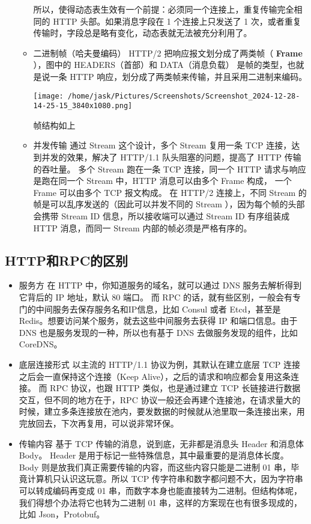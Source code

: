 \documentclass[11pt]{article}
\begin{document}
\begin{itemize}
\begin{itemize}
所以，使得动态表生效有一个前提：必须同一个连接上，重复传输完全相同的 HTTP 头部。如果消息字段在 1 个连接上只发送了 1 次，或者重复传输时，字段总是略有变化，动态表就无法被充分利用了。
\item 二进制帧（哈夫曼编码）
HTTP/2 把响应报文划分成了两类帧（ \textbf{Frame} ），图中的 HEADERS（首部）和 DATA（消息负载） 是帧的类型，也就是说一条 HTTP 响应，划分成了两类帧来传输，并且采用二进制来编码。
\begin{center}
\texttt{[image: /home/jask/Pictures/Screenshots/Screenshot\_2024-12-28-14-25-15\_3840x1080.png]}
\end{center}
帧结构如上
\item 并发传输
通过 Stream 这个设计，多个 Stream 复用一条 TCP 连接，达到并发的效果，解决了 HTTP/1.1 队头阻塞的问题，提高了 HTTP 传输的吞吐量。
多个 Stream 跑在一条 TCP 连接，同一个 HTTP 请求与响应是跑在同一个 Stream 中，HTTP 消息可以由多个 Frame 构成， 一个 Frame 可以由多个 TCP 报文构成。
在 HTTP/2 连接上，不同 Stream 的帧是可以乱序发送的（因此可以并发不同的 Stream ），因为每个帧的头部会携带 Stream ID 信息，所以接收端可以通过 Stream ID 有序组装成 HTTP 消息，而同一 Stream 内部的帧必须是严格有序的。
\end{itemize}
\end{itemize}
\subsection{HTTP和RPC的区别}
\label{sec:orgb0542b6}
\begin{itemize}
\item 服务方
在 HTTP 中，你知道服务的域名，就可以通过 DNS 服务去解析得到它背后的 IP 地址，默认 80 端口。
而 RPC 的话，就有些区别，一般会有专门的中间服务去保存服务名和IP信息，比如 Consul 或者 Etcd，甚至是 Redis。想要访问某个服务，就去这些中间服务去获得 IP 和端口信息。由于 DNS 也是服务发现的一种，所以也有基于 DNS 去做服务发现的组件，比如CoreDNS。
\item 底层连接形式
以主流的 HTTP/1.1 协议为例，其默认在建立底层 TCP 连接之后会一直保持这个连接（Keep Alive），之后的请求和响应都会复用这条连接。
而 RPC 协议，也跟 HTTP 类似，也是通过建立 TCP 长链接进行数据交互，但不同的地方在于，RPC 协议一般还会再建个连接池，在请求量大的时候，建立多条连接放在池内，要发数据的时候就从池里取一条连接出来，用完放回去，下次再复用，可以说非常环保。
\item 传输内容
基于 TCP 传输的消息，说到底，无非都是消息头 Header 和消息体 Body。
Header 是用于标记一些特殊信息，其中最重要的是消息体长度。
Body 则是放我们真正需要传输的内容，而这些内容只能是二进制 01 串，毕竟计算机只认识这玩意。所以 TCP 传字符串和数字都问题不大，因为字符串可以转成编码再变成 01 串，而数字本身也能直接转为二进制。但结构体呢，我们得想个办法将它也转为二进制 01 串，这样的方案现在也有很多现成的，比如 Json，Protobuf。
\end{itemize}
\end{document}
